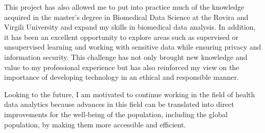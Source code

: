 This project has also allowed me to put into practice much of the knowledge acquired in the master's degree in Biomedical Data Science at the Rovira and Virgili University and expand my skills in biomedical data analysis. In addition, it has been an excellent opportunity to explore areas such as supervised or unsupervised learning and working with sensitive data while ensuring privacy and information security. This challenge has not only brought new knowledge and value to my professional experience but has also reinforced my view on the importance of developing technology in an ethical and responsible manner.
 
Looking to the future, I am motivated to continue working in the field of health data analytics because advances in this field can be translated into direct improvements for the well-being of the population, including the global population, by making them more accessible and efficient.